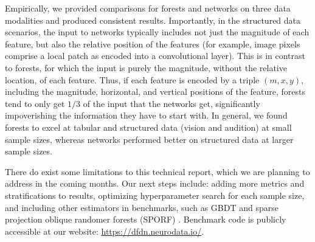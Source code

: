 Empirically, we provided comparisons for forests and networks on three data modalities and produced consistent results. Importantly, in the structured data scenarios, the input to networks typically includes not just the magnitude of each feature, but also the relative position of the features (for example, image pixels comprise a local patch as encoded into a convolutional layer). This is in contrast to forests, for which the input is purely the magnitude, without the relative location, of each feature. Thus, if each feature is encoded by a triple $(m,x,y)$, including the magnitude, horizontal, and vertical positions of the feature, forests tend to only get $1/3$ of the input that the networks get, significantly impoverishing the information they have to start with. In general, we found forests to excel at tabular and structured data (vision and audition) at small sample sizes, whereas networks performed better on structured data at larger sample sizes. 

There do exist some limitations to this technical report, which we are planning to address in the coming months. Our next steps include: adding more metrics and stratifications to results, optimizing hyperparameter search for each sample size, and including other estimators in benchmarks, such as GBDT and sparse projection oblique randomer forests (SPORF) \citep{sporf}. Benchmark code is publicly accessible at our website: \url{https://dfdn.neurodata.io/}.

